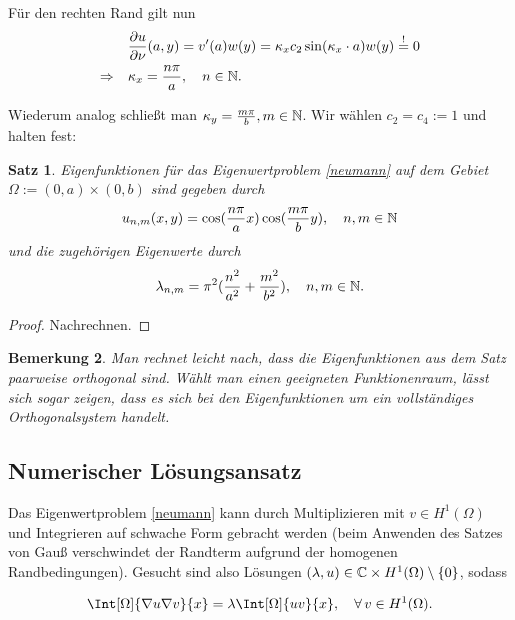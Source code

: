 \documentclass{article}
\theoremstyle{plain}
\newtheorem{theorem}    {Satz}   [section]
\newtheorem{remark}     [theorem]{Bemerkung}
\begin{document}
Für den rechten Rand gilt nun
\begin{align*}
	&\frac{\partial u}{\partial \nu}(a,y) = v'(a)w(y) = \kappa_{x} c_2 \sin(\kappa_{x} \cdot a)w(y) \stackrel{!}{=} 0 \\
	\Rightarrow \quad &\kappa_x = \frac{n \pi}{a}, \quad n \in \mathbb{N}.
\end{align*}

Wiederum analog schließt man $\kappa_y = \frac{m \pi}{b}, m \in \mathbb{N}$. Wir wählen $c_2 = c_4 := 1$ und halten fest:

\begin{theorem}\label{satz_1_2}
	Eigenfunktionen für das Eigenwertproblem \eqref{neumann} auf dem Gebiet $\Omega := (0,a) \times (0,b)$ sind gegeben durch
	\begin{align*}
		u_{n,m}(x,y) = \cos(\frac{n \pi}{a}x)\cos(\frac{m \pi}{b}y), \quad n,m \in \mathbb{N}
	\end{align*}
	und die zugehörigen Eigenwerte durch
	\begin{align*}
		\lambda_{n,m} = \pi^2(\frac{n^2}{a^2} + \frac{m^2}{b^2}), \quad n,m \in \mathbb{N}.
	\end{align*}
\end{theorem}

\begin{proof}
	Nachrechnen.
\end{proof}

\begin{remark}
	Man rechnet leicht nach, dass die Eigenfunktionen aus dem Satz paarweise orthogonal sind. Wählt man einen geeigneten Funktionenraum, lässt sich sogar zeigen, dass es sich bei den Eigenfunktionen um ein vollständiges Orthogonalsystem handelt.
\end{remark}

\subsection{Numerischer Lösungsansatz}

Das Eigenwertproblem \eqref{neumann} kann durch Multiplizieren mit $v \in H^1(\Omega)$ und Integrieren auf schwache Form gebracht werden (beim Anwenden des Satzes von Gauß verschwindet der Randterm aufgrund der homogenen Randbedingungen). Gesucht sind also Lösungen $(\lambda, u) \in \mathbb{C} \times H^1(\Omega) \setminus \{0\}$, sodass

\begin{align*}
	\Int[\Omega]{\nabla u \nabla v}{x} = \lambda \Int[\Omega]{uv}{x}, \quad \Forall v \in H^1(\Omega).
\end{align*}
\end{document}
